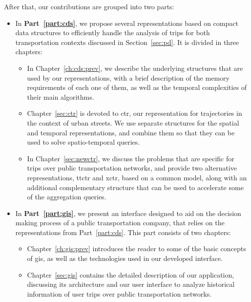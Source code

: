 \documentclass[a4paper,10pt,twoside]{book}
\begin{document}
	After that, our contributions are grouped into two parts:
	
	\begin{itemize}
	    \item In \textbf{Part~\ref{part:cds}}, we propose several representations based on compact data structures to efficiently handle the analysis of trips for both transportation contexts discussed in Section~\ref{sec:pd}. It is divided in three chapters:
	    
	    \begin{itemize}
	        \item In Chapter~\ref{ch:cds:prev}, we describe the underlying structures that are used by our representations, with a brief description of the memory requirements of each one of them, as well as the temporal complexities of their main algorithms.
	        
	        \item Chapter~\ref{sec:ctr} is devoted to \gls{ctr}, our representation for trajectories in the context of urban streets. We use separate structures for the spatial and temporal representations, and combine them so that they can be used to solve spatio-temporal queries.
	        
	        \item In Chapter~\ref{sec:newctr}, we discuss the problems that are specific for trips over public transportation networks, and provide two alternative representations, \gls{ttctr} and \gls{xctr}, based on a common model, along with an additional complementary structure that can be used to accelerate some of the aggregation queries.
	    \end{itemize}
	    
	    \item In \textbf{Part~\ref{part:gis}}, we present an interface designed to aid on the decision making process of a public transportation company, that relies on the representations from Part~\ref{part:cds}. This part consists of two chapters:
	    
	    \begin{itemize}
	        \item Chapter~\ref{ch:gis:prev} introduces the reader to some of the basic concepts of \gls{gis}, as well as the technologies used in our developed interface.
	        
	        \item Chapter~\ref{sec:gis} contains the detailed description of our application, discussing its architecture and our user interface to analyze historical information of user trips over public transportation networks.
	    \end{itemize}
	\end{itemize}
	
\end{document}
